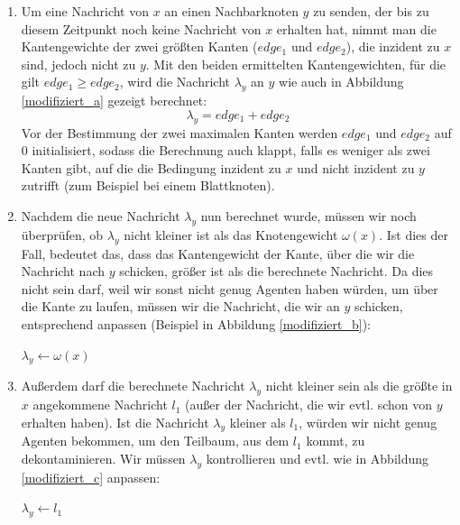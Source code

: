 \begin{enumerate}[label=\alph*)]
	
	\item 
		Um eine Nachricht von $x$ an einen Nachbarknoten $y$ zu senden, der bis zu diesem Zeitpunkt noch keine Nachricht von $x$ erhalten hat, nimmt man die Kantengewichte der zwei größten Kanten ($edge_{1}$ und $edge_{2}$), die inzident zu $x$ sind, jedoch nicht zu $y$. Mit den beiden ermittelten Kantengewichten, für die gilt $edge_{1} \ge edge_{2}$, wird die Nachricht $\lambda_{y}$ an $y$ wie auch in Abbildung \ref{modifiziert_a} gezeigt berechnet:
		$$\lambda_{y} = edge_{1} + edge_{2}$$
		Vor der Bestimmung der zwei maximalen Kanten werden $edge_{1}$ und $edge_{2}$ auf 0 initialisiert, sodass die Berechnung auch klappt, falls es weniger als zwei Kanten gibt, auf die die Bedingung inzident zu $x$ und nicht inzident zu $y$ zutrifft (zum Beispiel bei einem Blattknoten).
	
	\item
		Nachdem die neue Nachricht $\lambda_{y}$ nun berechnet wurde, müssen wir noch überprüfen, ob $\lambda_{y}$ nicht kleiner ist als das Knotengewicht $\omega(x)$. Ist dies der Fall, bedeutet das, dass das Kantengewicht der Kante, über die wir die Nachricht nach $y$ schicken, größer ist als die berechnete Nachricht. Da dies nicht sein darf, weil wir sonst nicht genug Agenten haben würden, um über die Kante zu laufen, müssen wir die Nachricht, die wir an $y$ schicken, entsprechend anpassen (Beispiel in Abbildung \ref{modifiziert_b}):
		
		\begin{algorithmic}
			\State $\lambda_{y} \gets \omega(x)$
			\EndIf
		\end{algorithmic}
	
	\item
		Außerdem darf die berechnete Nachricht $\lambda_{y}$ nicht kleiner sein als die größte in $x$ angekommene Nachricht $l_{1}$ (außer der Nachricht, die wir evtl. schon von $y$ erhalten haben). Ist die Nachricht $\lambda_{y}$ kleiner als $l_{1}$, würden wir nicht genug Agenten bekommen, um den Teilbaum, aus dem $l_{1}$ kommt, zu dekontaminieren. Wir müssen $\lambda_{y}$ kontrollieren und evtl. wie in Abbildung \ref{modifiziert_c} anpassen:
		
		\begin{algorithmic}
			\If {$\lambda_{y} \leq l_{1}$}
			\State $\lambda_{y} \gets l_{1}$
			\EndIf
		\end{algorithmic}
	
\end{enumerate}

